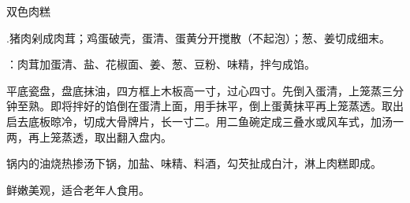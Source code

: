 \begin{recipe}[金银肉糕]{双色肉糕}

\ingredients


\cooking

\step .猪肉剁成肉茸；鸡蛋破壳，蛋清、蛋黄分开搅散（不起泡）；葱、姜切成细末。

\step ：肉茸加蛋清、盐、花椒面、姜、葱、豆粉、味精，拌勻成馅。

\step 平底瓷盘，盘底抹油，四方框上木板高一寸，过心四寸。先倒入蛋清，上笼蒸三分钟至熟。即将拌好的馅倒在蛋清上面，用手抹平，倒上蛋黄抹平再上笼蒸透。取出启去底板晾冷，切成大骨牌片，长一寸二。用二鱼碗定成三叠水或风车式，加汤一两，再上笼蒸透，取出翻入盘内。

\step 锅内的油烧热掺汤下锅，加盐、味精、料酒，勾芡扯成白汁，淋上肉糕即成。

\notes

鲜嫩美观，适合老年人食用。



\end{recipe}

